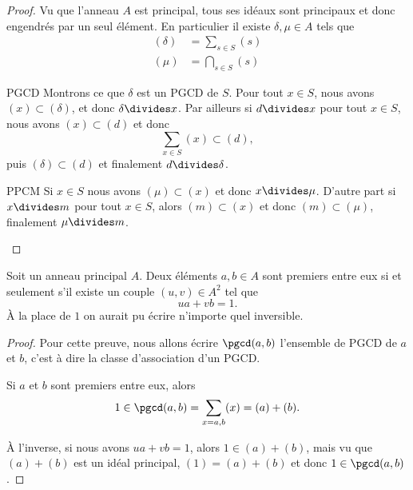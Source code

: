 \begin{proof}
    Vu que l'anneau \( A\) est principal, tous ses idéaux sont principaux et donc engendrés par un seul élément. En particulier il existe \( \delta,\mu\in A\) tels que
    \begin{subequations}
        \begin{align}
            (\delta)&=\sum_{s\in S}(s)\\
            (\mu)&=\bigcap_{s\in S}(s)
        \end{align}
    \end{subequations}
    \begin{subproof}
    \item[PGCD]
        Montrons ce que \( \delta\) est un PGCD de \( S\). Pour tout \( x\in S\), nous avons \( (x)\subset (\delta)\), et donc \( \delta\divides x\). Par ailleurs si \( d\divides x\) pour tout \( x\in S\), nous avons \( (x)\subset (d)\) et donc 
        \begin{equation}
            \sum_{x\in S}(x)\subset (d),
        \end{equation}
        puis \( (\delta)\subset (d)\) et finalement \( d\divides \delta\).
        \item[PPCM]
            Si \( x\in S\) nous avons \( (\mu)\subset (x)\) et donc \( x\divides \mu\). D'autre part si \( x\divides m\) pour tout \( x\in S\), alors \( (m)\subset (x)\) et donc \( (m)\subset(\mu)\), finalement \( \mu\divides m\).
    \end{subproof}
\end{proof}

\begin{corollary}\label{CorimHyXy}
    Soit un anneau principal \( A\). Deux éléments \( a,b\in A\) sont premiers entre eux si et seulement s'il existe un couple \( (u, v)\in A^2 \) tel que
    \begin{equation}
        ua+vb=1.
    \end{equation}
    À la place de \( 1\) on aurait pu écrire n'importe quel inversible.
\end{corollary}

\begin{proof}
    Pour cette preuve, nous allons écrire \( \pgcd(a,b)\) l'ensemble de PGCD de \( a\) et \( b\), c'est à dire la classe d'association d'un PGCD.

    Si \( a\) et \( b\) sont premiers entre eux, alors
    \begin{equation}
        1\in\pgcd(a,b)=\sum_{x=a,b}(x)=(a)+(b).
    \end{equation}
    
    À l'inverse, si nous avons \( ua+vb=1\), alors \( 1\in (a)+(b)\), mais vu que \( (a)+(b)\) est un idéal principal, \( (1)=(a)+(b)\) et donc \( 1\in \pgcd(a,b)\).
\end{proof}

